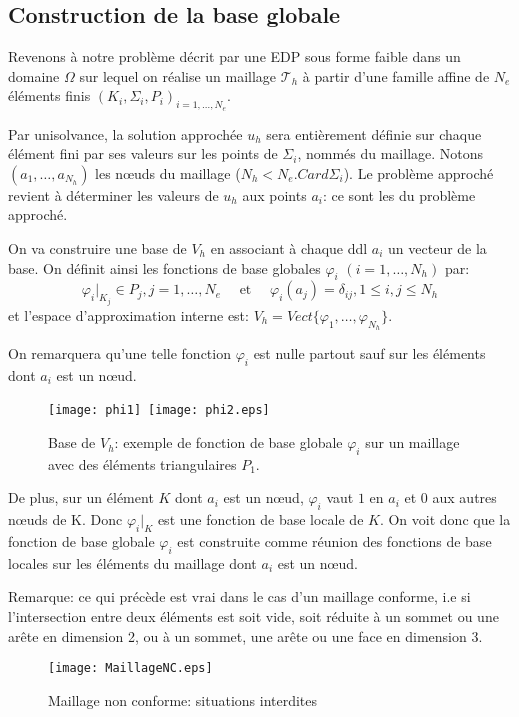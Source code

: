 \medskip
\subsection{Construction de la base globale}

Revenons à notre problème décrit par une EDP sous forme faible dans un domaine
$\Omega$ sur lequel on réalise un maillage $\mathcal{T}_h$ à partir d'une famille affine
de $N_e$ éléments finis $(K_i, \Sigma_i, P_i)_{i=1,\ldots,N_e}$.

\medskip
Par unisolvance, la solution approchée $u_h$ sera entièrement définie sur chaque élément fini
par ses valeurs sur les points de $\Sigma_i$, nommés  du maillage.
Notons $(a_1,\ldots, a_{N_h})$ les nœuds du maillage ($N_h<N_e . Card\Sigma_i$).
Le problème approché revient à déterminer les valeurs de $u_h$ aux points $a_i$:
ce sont les  du problème approché.

\medskip
On va construire une base de $V_h$ en associant à chaque ddl $a_i$ un vecteur de la base.
On définit ainsi les fonctions de base globales $\varphi_i$ $(i = 1,\ldots, N_h)$ par:
\begin{equation}\varphi_i|_{K_j} \in P_j, j = 1,\ldots, N_e \quad \text{ et }\quad \varphi_i(a_j) = \delta_{ij}, 1\le i,j\le N_h\end{equation}
et l'espace d'approximation interne est: $V_h=Vect\{\varphi_1,\ldots, \varphi_{N_h}\}$.

On remarquera qu'une telle fonction $\varphi_i$ est nulle partout sauf sur les éléments
dont $a_i$ est un nœud.
\begin{figure}[ht]
\centering
\texttt{[image: phi1]}~\texttt{[image: phi2.eps]}
\caption{\label{BaseVh} Base de $V_h$: exemple de fonction de base globale $\varphi_i$ sur un maillage avec des éléments triangulaires $P_1$.}
\end{figure}

\medskip
De plus, sur un élément $K$ dont $a_i$ est un nœud, $\varphi_i$ vaut $1$ en $a_i$ et
$0$ aux autres nœuds de K. Donc $\varphi_i|_K$ est une fonction de base locale de $K$.
On voit donc que la fonction de base globale $\varphi_i$ est construite comme réunion des
fonctions de base locales sur les éléments du maillage dont $a_i$ est un nœud.

\medskip
Remarque: ce qui précède est vrai dans le cas d'un maillage conforme, i.e si
l'intersection entre deux éléments est soit vide, soit réduite à un
sommet ou une arête en dimension 2, ou à un sommet, une arête ou une face
en dimension 3.
\begin{figure}[ht]
\centering
\texttt{[image: MaillageNC.eps]}
\caption{\label{maillageNC} Maillage non conforme: situations interdites}
\end{figure}

